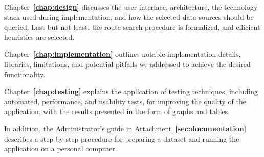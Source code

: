 Chapter~\textbf{\ref{chap:design}} discusses the user interface, architecture, the technology stack used during implementation, and how the selected data sources should be queried. Last but not least, the route search procedure is formalized, and efficient heuristics are selected.

Chapter~\textbf{\ref{chap:implementation}} outlines notable implementation details, libraries, limitations, and potential pitfalls we addressed to achieve the desired functionality.

Chapter~\textbf{\ref{chap:testing}} explains the application of testing techniques, including automated, performance, and usability tests, for improving the quality of the application, with the results presented in the form of graphs and tables.

In addition, the Administrator's guide in Attachment~\textbf{\ref{sec:documentation}} describes a step-by-step procedure for preparing a dataset and running the application on a personal computer.
